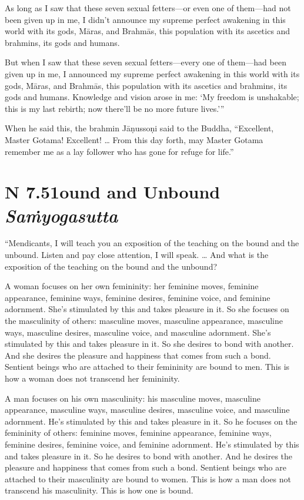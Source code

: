 \documentclass[12pt,openany]{book}%
\newcommand*{\suttatitleacronym}[1]{\smaller[2]{#1}\vspace*{.3em}}
\newcommand*{\suttatitletranslation}[1]{\linebreak{#1}}
\newcommand*{\suttatitleroot}[1]{\linebreak\smaller[2]\itshape{#1}}
\newcommand*{\tocacronym}[1]{\hspace*{-3.3em}{#1}\quad}
\newcommand*{\toctranslation}[1]{#1}
\newcommand*{\tocroot}[1]{(\textit{#1})}
\begin{document}
As long as I saw that these seven sexual fetters—or even one of them—had not been given up in me, I didn’t announce my supreme perfect awakening in this world with its gods, \textsanskrit{Māras}, and \textsanskrit{Brahmās}, this population with its ascetics and brahmins, its gods and humans. 

But when I saw that these seven sexual fetters—every one of them—had been given up in me, I announced my supreme perfect awakening in this world with its gods, \textsanskrit{Māras}, and \textsanskrit{Brahmās}, this population with its ascetics and brahmins, its gods and humans. Knowledge and vision arose in me: ‘My freedom is unshakable; this is my last rebirth; now there’ll be no more future lives.’” 

When he said this, the brahmin \textsanskrit{Jāṇussoṇi} said to the Buddha, “Excellent, Master Gotama! Excellent! … From this day forth, may Master Gotama remember me as a lay follower who has gone for refuge for life.” 

%
\section*{{\suttatitleacronym AN 7.51}{\suttatitletranslation Bound and Unbound }{\suttatitleroot Saṁyogasutta}}
\addcontentsline{toc}{section}{\tocacronym{AN 7.51} \toctranslation{Bound and Unbound } \tocroot{Saṁyogasutta}}

“Mendicants, I will teach you an exposition of the teaching on the bound and the unbound. Listen and pay close attention, I will speak. … And what is the exposition of the teaching on the bound and the unbound? 

A woman focuses on her own femininity: her feminine moves, feminine appearance, feminine ways, feminine desires, feminine voice, and feminine adornment. She’s stimulated by this and takes pleasure in it. So she focuses on the masculinity of others: masculine moves, masculine appearance, masculine ways, masculine desires, masculine voice, and masculine adornment. She’s stimulated by this and takes pleasure in it. So she desires to bond with another. And she desires the pleasure and happiness that comes from such a bond. Sentient beings who are attached to their femininity are bound to men. This is how a woman does not transcend her femininity. 

A man focuses on his own masculinity: his masculine moves, masculine appearance, masculine ways, masculine desires, masculine voice, and masculine adornment. He’s stimulated by this and takes pleasure in it. So he focuses on the femininity of others: feminine moves, feminine appearance, feminine ways, feminine desires, feminine voice, and feminine adornment. He’s stimulated by this and takes pleasure in it. So he desires to bond with another. And he desires the pleasure and happiness that comes from such a bond. Sentient beings who are attached to their masculinity are bound to women. This is how a man does not transcend his masculinity. This is how one is bound. 
\end{document}
